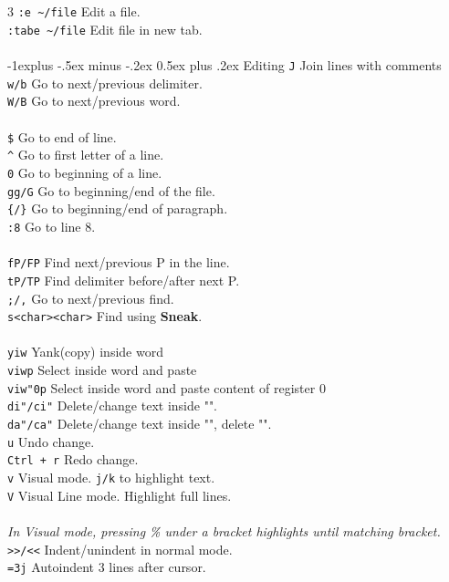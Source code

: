 \documentclass[10pt,landscape]{article}
\makeatletter
\renewcommand{\subsection}{\@startsection{subsection}{2}{0mm}%
                                {-1explus -.5ex minus -.2ex}%
                                {0.5ex plus .2ex}%
                                {\normalfont\normalsize\bfseries}}
\makeatother
\begin{document}
\begin{multicols}{3}
\verb!:e ~/file! \hfill Edit a file.\\
\verb!:tabe ~/file! \hfill Edit file in new tab.\\

\verb! !\\
\subsection{Editing}
\verb!J! \hfill Join lines with comments\\
\verb!w/b! \hfill Go to next/previous delimiter.\\
\verb!W/B! \hfill Go to next/previous word.\\
\verb! !\\
\verb!$! \hfill Go to end of line.\\
\verb!^! \hfill Go to first letter of a line.\\
\verb!0! \hfill Go to beginning of a line.\\
\verb!gg/G! \hfill Go to beginning/end of the file.\\
\verb!{/}! \hfill Go to beginning/end of paragraph.\\ 
\verb!:8! \hfill Go to line 8.\\
\verb! !\\
\verb!fP/FP! \hfill Find next/previous P in the line.\\
\verb!tP/TP! \hfill Find delimiter before/after next P.\\
\verb!;/,! \hfill Go to next/previous find.\\
\verb!s<char><char>! \hfill Find using \textbf{Sneak}.\\
\verb! !\\
\verb!yiw! \hfill Yank(copy) inside word\\
\verb!viwp! \hfill Select inside word and paste\\
\verb!viw"0p! \hfill Select inside word and paste content of register 0\\
\verb!di"/ci"! \hfill Delete/change text inside "".\\
\verb!da"/ca"! \hfill Delete/change text inside "", delete "".\\
\verb!u! \hfill Undo change.\\
\verb!Ctrl + r! \hfill Redo change.\\
\verb!v! \hfill Visual mode. \verb!j/k! to highlight text.\\
\verb!V! \hfill Visual Line mode. Highlight full lines.\\
\verb! !\\
\textit{In Visual mode, pressing \% under a bracket highlights until matching bracket.}\\
\verb!>>/<<! \hfill Indent/unindent in normal mode.\\
\verb!=3j! \hfill Autoindent 3 lines after cursor.\\


\end{multicols}
\end{document}
